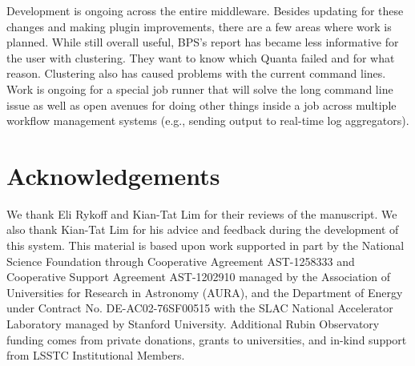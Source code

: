 \documentclass[11pt,twoside]{article}
\begin{document}
Development is ongoing across the entire middleware.  Besides updating for
these changes and making plugin improvements, there are a few areas where
work is planned.  While still overall useful, BPS's report has became less
informative for the user with clustering.  They want to know which Quanta
failed and for what reason.  Clustering also has caused problems with
the current command lines.  Work is ongoing for a special job runner that
will solve the long command line issue as well as open avenues for doing
other things inside a job across multiple workflow management systems
(e.g., sending output to real-time log aggregators).

\section*{Acknowledgements}
We thank Eli Rykoff and Kian-Tat Lim for their reviews of the
manuscript. We also thank Kian-Tat Lim for his advice and feedback
during the development of this system.  This material is based upon work
supported in part by the National Science Foundation through Cooperative
Agreement AST-1258333 and Cooperative Support Agreement AST-1202910
managed by the Association of Universities for Research in Astronomy
(AURA), and the Department of Energy under Contract No. DE-AC02-76SF00515
with the SLAC National Accelerator Laboratory managed by Stanford
University. Additional Rubin Observatory funding comes from private
donations, grants to universities, and in-kind support from LSSTC
Institutional Members.




\end{document}
